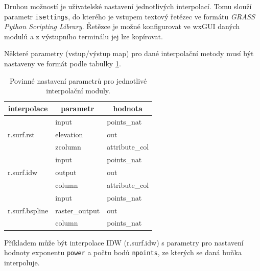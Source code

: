 \documentclass[a4paper,12pt,oneside]{report}
\begin{document}
Druhou možností je uživatelské nastavení jednotlivých interpolací. Tomu
 slouží parametr \texttt{isettings}, do kterého je
vstupem textový řetězec ve formátu \textit{GRASS Python Scripting
  Library}.  Řetězce je možné konfigurovat ve wxGUI daných modulů a z
výstupního terminálu jej lze kopírovat.


Některé parametry (vstup/výstup map) pro dané interpolační metody musí
být nastaveny ve formát podle tabulky \ref{tab:interpol}.

\begin{table}[h]
\centering
\begin{tabular}{|lll|}
\hline
\multicolumn{1}{|c}{interpolace} & \multicolumn{1}{c}{parametr} & \multicolumn{1}{c|}{hodnota} \\ \hline\hline
\multirow{3}{*}{r.surf.rst}      & input                        & points\_nat                  \\
                                 & elevation                    & out                          \\
                                 & zcolumn                      & attribute\_col               \\\hline
\multirow{3}{*}{r.surf.idw}      & input                        & points\_nat                  \\
                                 & output                       & out                          \\
                                 & column                       & attribute\_col               \\\hline
\multirow{3}{*}{r.surf.bspline}  & input                        & points\_nat                  \\
                                 & raster\_output               & out                          \\
                                 & column                       & points\_nat                  \\ \hline
\end{tabular}
\caption{Povinné nastavení parametrů pro jednotlivé interpolační moduly.}
\label{tab:interpol}
\end{table}



Příkladem může být interpolace IDW (r.surf.idw) s parametry pro
nastavení hodnoty exponentu \texttt{power} a počtu bodů
\texttt{npoints}, ze kterých se daná buňka interpoluje.
\end{document}
